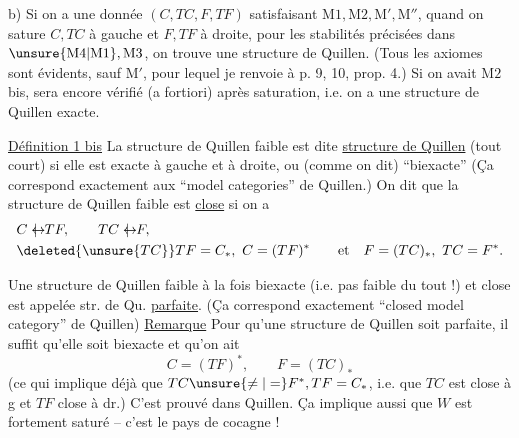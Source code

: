 b) Si on a une  donnée $(C,TC,F,TF)$ satisfaisant $\mathrm M1,\mathrm M2,\mathrm M',\mathrm M''$, quand on sature $C,TC$ à gauche et $F,TF$ à droite, pour les stabilités précisées dans $\unsure{\mathrm M4|\mathrm M1},\mathrm M3$, on trouve une structure de Quillen. (Tous les axiomes sont évidents, sauf $\mathrm M'$, pour lequel je renvoie à p. 9, 10,  prop. 4.) Si on avait $\mathrm M2$ bis,  sera encore vérifié (a fortiori) après saturation, i.e. on a une structure de Quillen exacte.

\uline{Définition 1 bis} La structure de Quillen faible est dite \uline{structure de Quillen} (tout court) si elle est exacte à gauche et à droite, ou (comme on dit) ``biexacte''\unsure{;}  (Ça correspond exactement aux ``model categories'' de Quillen.) On dit que la structure de Quillen faible est \uline{close} si on a
\[
\begin{aligned}
&C\mathrel{\leftrightarrow\mkern-15mu\mid\mkern4mu}TF,\qquad TC\mathrel{\leftrightarrow\mkern-15mu\mid\mkern4mu}F,\\
&\deleted{\unsure{TC}}TF=C_{*},\ C=(TF)^{*}\qquad\text{et}\quad F=(TC)_{*},\ TC=F^{*}.
\end{aligned}
\]

Une structure de Quillen faible à la fois biexacte (i.e. pas faible du tout !) et close est appelée str. de Qu. \uline{parfaite}. (Ça correspond exactement   ``closed model category'' de Quillen)
\uline{Remarque} Pour qu'une structure de Quillen  soit parfaite, il suffit qu'elle soit biexacte et qu'on ait
\[
 C=(TF)^{*},\qquad F=(TC)_{*}
\]
 (ce qui implique déjà que $TC\unsure{\ne|=}F^{*},TF=C_{*}$, i.e. que $TC$ est close à g et $TF$ close à dr.) C'est prouvé dans Quillen. Ça implique aussi que $W$ est fortement saturé -- c'est le pays de cocagne !

